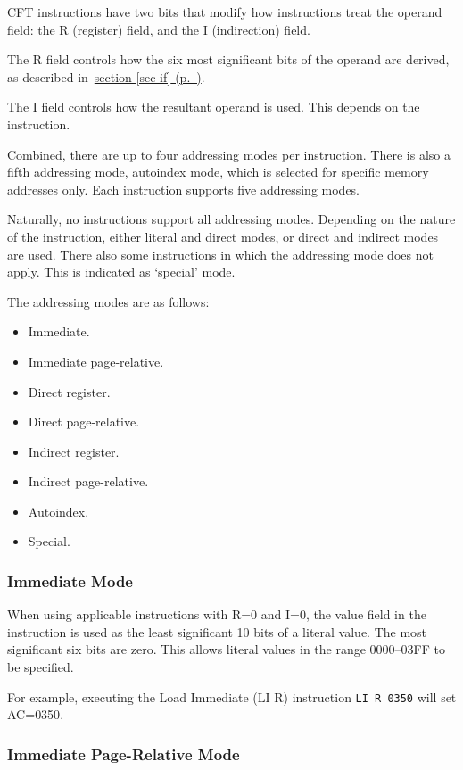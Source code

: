 \documentclass[11pt,a4paper,twocolumns]{article}
\newcommand{\cf}[2][section]{\hyperref[#2]{#1 \ref*{#2} (p.~\pageref*{#2})}}
\newcommand\hex[1]{\textsf{#1}}
\newcommand\register[1]{\textsf{#1}}
\newcommand\A{\register{AC}}
\begin{document}
CFT instructions have two bits that modify how instructions treat the
operand field: the R (register) field, and the I (indirection)
field.

The R field controls how the six most significant bits of the operand
are derived, as described in~\cf{sec-if}.

The I field controls how the resultant operand is used. This depends
on the instruction.

Combined, there are up to four addressing modes per instruction. There
is also a fifth addressing mode, autoindex mode, which is selected for
specific memory addresses only. Each instruction supports five
addressing modes. 

Naturally, no instructions support all addressing modes. Depending on
the nature of the instruction, either literal and direct modes, or
direct and indirect modes are used. There also some instructions in
which the addressing mode does not apply. This is indicated as
‘special’ mode.

The addressing modes are as follows:

\begin{itemize}
  \item Immediate.
  \item Immediate page-relative.
  \item Direct register.
  \item Direct page-relative.
  \item Indirect register.
  \item Indirect page-relative.
  \item Autoindex.
  \item Special.
\end{itemize}

\subsubsection{Immediate Mode}

When using applicable instructions with R=0 and I=0, the value field
in the instruction is used as the least significant 10 bits of a
literal value. The most significant six bits are zero. This allows
literal values in the range \hex{0000}–\hex{03FF} to be specified.

For example, executing the Load Immediate (LI R) instruction {\tt LI R
  0350} will set \A=\hex{0350}.

\subsubsection{Immediate Page-Relative Mode}
\end{document}
